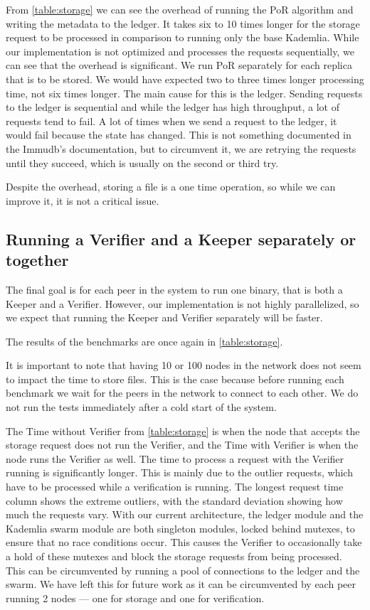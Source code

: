 From \autoref{table:storage} we can see the overhead of running the PoR algorithm and
writing the metadata to the ledger.
It takes six to 10 times longer for the storage request to be processed
in comparison to running only the base Kademlia.
While our implementation is not optimized and processes the requests sequentially,
we can see that the overhead is significant.
We run PoR separately for each replica that is to be stored.
We would have expected two to three times longer processing time,
not six times longer.
The main cause for this is the ledger.
Sending requests to the ledger is sequential and while the ledger has high throughput,
a lot of requests tend to fail.
A lot of times when we send a request to the ledger, it would fail because the state has changed.
This is not something documented in the Immudb's documentation, but to circumvent it,
we are retrying the requests until they succeed, which is usually on the second or third try.

Despite the overhead, storing a file is a one time operation,
so while we can improve it, it is not a critical issue.

\subsection{Running a Verifier and a Keeper separately or together}

The final goal is for each peer in the system to run one binary,
that is both a Keeper and a Verifier.
However, our implementation is not highly parallelized,
so we expect that running the Keeper and Verifier separately will be faster.

The results of the benchmarks are once again in \autoref{table:storage}.

It is important to note that having 10 or 100 nodes in the network does not seem to impact the
time to store files.
This is the case because before running each benchmark we wait for the peers in the network
to connect to each other.
We do not run the tests immediately after a cold start of the system.

The Time without Verifier from \autoref{table:storage} is when the node that accepts the storage request
does not run the Verifier, and the Time with Verifier is when the node runs the Verifier as well.
The time to process a request with the Verifier running is significantly longer.
This is mainly due to the outlier requests, which have to be processed while a verification is running.
The longest request time column shows the extreme outliers,
with the standard deviation showing how much the requests vary.
With our current architecture, the ledger module and the Kademlia swarm module are both singleton modules,
locked behind mutexes, to ensure that no race conditions occur.
This causes the Verifier to occasionally take a hold of these mutexes and block the
storage requests from being processed.
This can be circumvented by running a pool of connections to the ledger and the swarm.
We have left this for future work as it can be circumvented by each peer running 2 nodes ---
one for storage and one for verification.

